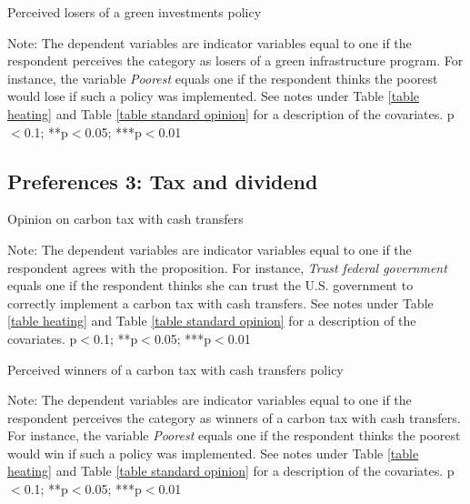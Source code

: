 \documentclass{article}
\begin{document}
\begin{table}[h!]
	\caption{Perceived losers of a green investments policy}
	\begin{center}
		\scalebox{0.7}{}
	\end{center}
	{\footnotesize Note: The dependent variables are indicator variables equal to one if the respondent perceives the category as losers of a green infrastructure program. For instance, the variable \textit{Poorest} equals one if the respondent thinks the poorest would lose if such a policy was implemented. See notes under Table \ref{table heating} and Table \ref{table standard opinion} for a description of the covariates.
	\newline *p$<$0.1; **p$<$0.05; ***p$<$0.01}
\end{table}	

\clearpage
\subsection{Preferences 3: Tax and dividend}

\begin{table}[h!]
	\caption{Opinion on carbon tax with cash transfers}
	\begin{center}
		\scalebox{0.7}{}
	\end{center}
	{\footnotesize Note: The dependent variables are indicator variables equal to one if the respondent agrees with the proposition. For instance, \textit{Trust federal government} equals one if the respondent thinks she can trust the U.S. government to correctly implement a carbon tax with cash transfers. See notes under Table \ref{table heating} and Table \ref{table standard opinion} for a description of the covariates.
	\newline *p$<$0.1; **p$<$0.05; ***p$<$0.01}
\end{table}	

\begin{table}[h!]
	\caption{Perceived winners of a carbon tax with cash transfers policy}
	\begin{center}
		\scalebox{0.7}{}
	\end{center}
	{\footnotesize Note: The dependent variables are indicator variables equal to one if the respondent perceives the category as winners of a carbon tax with cash transfers. For instance, the variable \textit{Poorest} equals one if the respondent thinks the poorest would win if such a policy was implemented. See notes under Table \ref{table heating} and Table \ref{table standard opinion} for a description of the covariates.
	\newline *p$<$0.1; **p$<$0.05; ***p$<$0.01}
\end{table}	
\end{document}
